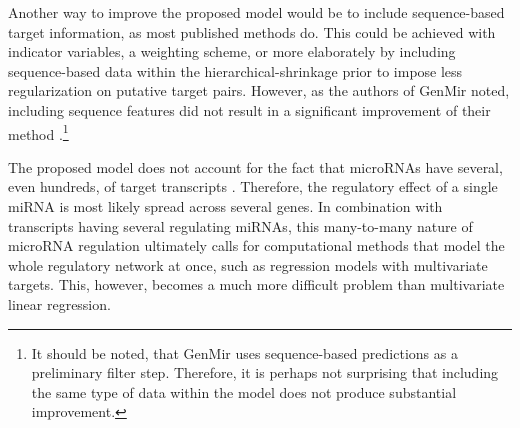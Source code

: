Another way to improve the proposed model would be to include sequence-based
target information, as most published methods do. This could be achieved with
indicator variables, a weighting scheme, or more elaborately by including
sequence-based data within the hierarchical-shrinkage prior to impose less
regularization on putative target pairs. However, as the authors of GenMir
noted, including sequence features did not result in a significant improvement
of their method \citep{Huang2008}.\footnote{It should be noted, that GenMir
uses sequence-based predictions as a preliminary filter step. Therefore,
it is perhaps not surprising that including the same type of data within the
model does not produce substantial improvement.}



The proposed model does not account for the fact that microRNAs have
several, even hundreds, of target transcripts \citep{Friedman2009}. Therefore, the
regulatory effect of a single miRNA is most likely spread across several
genes. In combination with transcripts having several regulating miRNAs, this
many-to-many nature of microRNA regulation ultimately calls for computational
methods that model the whole regulatory network at once, such as regression
models with multivariate targets. This, however, becomes a much more difficult
problem than multivariate linear regression.

